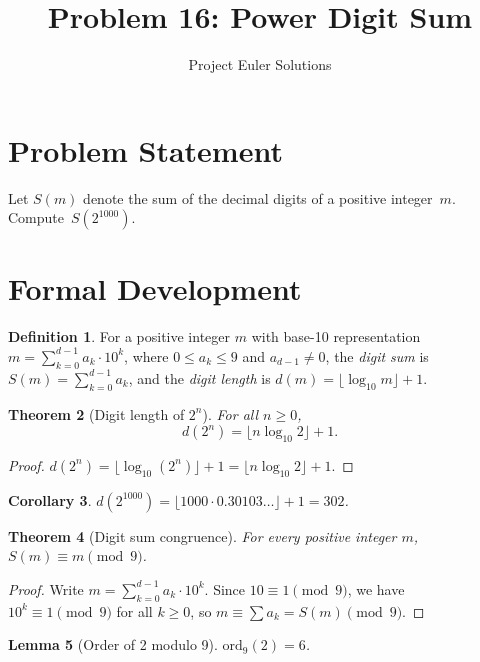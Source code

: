 \documentclass[12pt,a4paper]{article}
\title{Problem 16: Power Digit Sum}
\author{Project Euler Solutions}
\date{}
\newtheorem{theorem}{Theorem}
\newtheorem{lemma}[theorem]{Lemma}
\newtheorem{corollary}[theorem]{Corollary}
\theoremstyle{definition}
\newtheorem{definition}[theorem]{Definition}
\begin{document}
\maketitle

\section{Problem Statement}
Let $S(m)$ denote the sum of the decimal digits of a positive integer~$m$. Compute~$S(2^{1000})$.

\section{Formal Development}

\begin{definition}
For a positive integer $m$ with base-10 representation $m = \sum_{k=0}^{d-1} a_k \cdot 10^k$,
where $0 \le a_k \le 9$ and $a_{d-1} \ne 0$, the \emph{digit sum} is $S(m) = \sum_{k=0}^{d-1} a_k$,
and the \emph{digit length} is $d(m) = \lfloor \log_{10} m \rfloor + 1$.
\end{definition}

\begin{theorem}[Digit length of $2^n$]
For all $n \ge 0$,
\[
d(2^n) = \lfloor n \log_{10} 2 \rfloor + 1.
\]
\end{theorem}

\begin{proof}
$d(2^n) = \lfloor \log_{10}(2^n) \rfloor + 1 = \lfloor n \log_{10} 2 \rfloor + 1.$
\end{proof}

\begin{corollary}
$d(2^{1000}) = \lfloor 1000 \cdot 0.30103\ldots \rfloor + 1 = 302$.
\end{corollary}

\begin{theorem}[Digit sum congruence]
For every positive integer $m$, $S(m) \equiv m \pmod{9}$.
\end{theorem}

\begin{proof}
Write $m = \sum_{k=0}^{d-1} a_k \cdot 10^k$. Since $10 \equiv 1 \pmod{9}$, we have
$10^k \equiv 1 \pmod{9}$ for all $k \ge 0$, so $m \equiv \sum a_k = S(m) \pmod{9}$.
\end{proof}

\begin{lemma}[Order of 2 modulo 9]
$\mathrm{ord}_9(2) = 6$.
\end{lemma}
\end{document}
